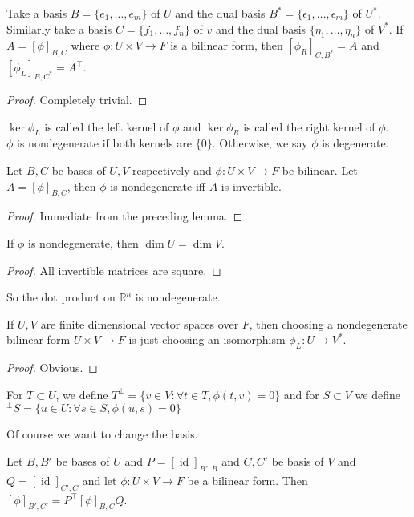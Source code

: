 \begin{lemma}
    Take a basis $B=\{e_1,\ldots,e_m\}$ of $U$ and the dual basis $B^\ast=\{\epsilon_1,\ldots,\epsilon_m\}$ of $U^\ast$.
    Similarly take a basis $C=\{f_1,\ldots,f_n\}$ of $v$ and the dual basis $\{\eta_1,\ldots,\eta_n\}$ of $V^\ast$.
    If $A=[\phi]_{B,C}$ where $\phi:U\times V\to F$ is a bilinear form, then $[\phi_R]_{C,B^\ast}=A$ and $[\phi_L]_{B,C^\ast}=A^\top$.
\end{lemma}
\begin{proof}
    Completely trivial.
\end{proof}
\begin{definition}
    $\ker\phi_L$ is called the left kernel of $\phi$ and $\ker\phi_R$ is called the right kernel of $\phi$.\\
    $\phi$ is nondegenerate if both kernels are $\{0\}$.
    Otherwise, we say $\phi$ is degenerate.
\end{definition}
\begin{lemma}
    Let $B,C$ be bases of $U,V$ respectively and $\phi:U\times V\to F$ be bilinear.
    Let $A=[\phi]_{B,C}$, then $\phi$ is nondegenerate iff $A$ is invertible.
\end{lemma}
\begin{proof}
    Immediate from the preceding lemma.
\end{proof}
\begin{corollary}
    If $\phi$ is nondegenerate, then $\dim U=\dim V$.
\end{corollary}
\begin{proof}
    All invertible matrices are square.
\end{proof}
\begin{example}
    So the dot product on $\mathbb R^n$ is nondegenerate.
\end{example}
\begin{corollary}
    If $U,V$ are finite dimensional vector spaces over $F$, then choosing a nondegenerate bilinear form $U\times V\to F$ is just choosing an isomorphism $\phi_L:U\to V^\ast$.
\end{corollary}
\begin{proof}
    Obvious.
\end{proof}
\begin{definition}
    For $T\subset U$, we define $T^\perp=\{v\in V:\forall t\in T,\phi(t,v)=0\}$ and for $S\subset V$ we define ${}^\perp S=\{u\in U:\forall s\in S,\phi(u,s)=0\}$
\end{definition}
Of course we want to change the basis.
\begin{proposition}\label{bilinear_change_of_basis}
    Let $B,B'$ be bases of $U$ and $P=[\operatorname{id}]_{B',B}$ and $C,C'$ be basis of $V$ and $Q=[\operatorname{id}]_{C',C}$ and let $\phi:U\times V\to F$ be a bilinear form.
    Then $[\phi]_{B',C'}=P^\top[\phi]_{B,C}Q$.
\end{proposition}
